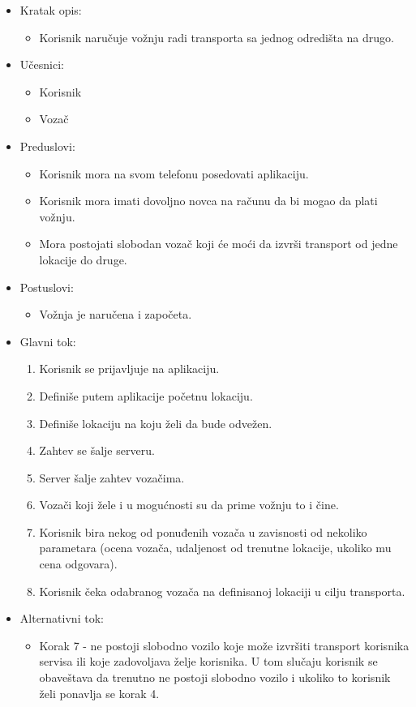 \begin{itemize}
	\item Kratak opis:
		\begin{itemize}
			\item Korisnik naručuje vožnju radi transporta sa jednog odredišta na drugo.
		\end{itemize}
	\item Učesnici:
		\begin{itemize}
			\item Korisnik
		    \item Vozač
		\end{itemize}				
	\item Preduslovi:
		\begin{itemize}
		    \item Korisnik mora na svom telefonu posedovati aplikaciju.
		    \item Korisnik mora imati dovoljno novca na računu da bi mogao da plati vožnju.
		    \item Mora postojati slobodan vozač koji će moći da izvrši transport od jedne lokacije do druge.
		\end{itemize}
	\item Postuslovi:
		\begin{itemize}
			\item Vožnja je naručena i započeta.
		\end{itemize}		
	\item Glavni tok:
		\begin{enumerate}
		    \item Korisnik se prijavljuje na aplikaciju.
		    \item Definiše putem  aplikacije  početnu lokaciju.
		    \item Definiše lokaciju na koju želi da bude odvežen.
		    \item Zahtev se šalje serveru.
		    \item Server šalje zahtev vozačima.
		    \item Vozači koji žele i u mogućnosti su da prime vožnju to i čine.
		    \item Korisnik bira nekog od ponuđenih vozača u zavisnosti od nekoliko parametara (ocena vozača, udaljenost od trenutne lokacije, ukoliko mu cena odgovara).
		    \item Korisnik čeka odabranog vozača na definisanoj lokaciji u cilju transporta.
		\end{enumerate}
	\item Alternativni tok:
		\begin{itemize}
    		\item Korak 7 - ne postoji slobodno vozilo koje može izvršiti transport korisnika servisa ili koje zadovoljava želje korisnika. U tom slučaju korisnik se obaveštava da trenutno ne postoji slobodno vozilo i ukoliko to korisnik želi ponavlja se korak 4.
		\end{itemize}
\end{itemize}


